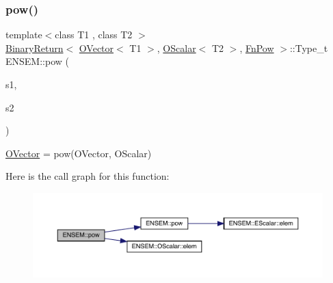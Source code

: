 \subsubsection{\texorpdfstring{pow()}{pow()}\hspace{0.1cm}{\footnotesize\ttfamily [2/3]}}
{\footnotesize\ttfamily template$<$class T1 , class T2 $>$ \\
\mbox{\hyperlink{structENSEM_1_1BinaryReturn}{Binary\+Return}}$<$ \mbox{\hyperlink{classENSEM_1_1OVector}{O\+Vector}}$<$ T1 $>$, \mbox{\hyperlink{classENSEM_1_1OScalar}{O\+Scalar}}$<$ T2 $>$, \mbox{\hyperlink{structENSEM_1_1FnPow}{Fn\+Pow}} $>$\+::Type\+\_\+t E\+N\+S\+E\+M\+::pow (\begin{DoxyParamCaption}\item[{const \mbox{\hyperlink{classENSEM_1_1OVector}{O\+Vector}}$<$ T1 $>$ \&}]{s1,  }\item[{const \mbox{\hyperlink{classENSEM_1_1OScalar}{O\+Scalar}}$<$ T2 $>$ \&}]{s2 }\end{DoxyParamCaption})\hspace{0.3cm}{\ttfamily [inline]}}



\mbox{\hyperlink{classENSEM_1_1OVector}{O\+Vector}} = pow(\+O\+Vector, O\+Scalar) 

Here is the call graph for this function\+:\nopagebreak
\begin{figure}[H]
\begin{center}
\leavevmode
\includegraphics[width=350pt]{da/d59/group__obsvector_gacd9051c476ef11d6697002aa2b6ecd7c_cgraph}
\end{center}
\end{figure}
\mbox{\label{group__obsvector_ga3466dc3452f93c110d8adba91bf1e85a}} 
